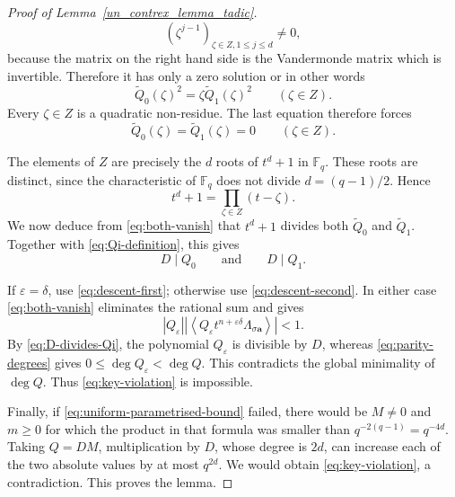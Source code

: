 \documentclass[10pt,a4paper]{amsart}
\begin{document}
\begin{proof}[Proof of Lemma~\ref{un_contrex_lemma_tadic}]
$$(\zeta^{j-1})_{\zeta\in Z, 1\le j\le d }\neq 0,
$$
because the matrix on the right hand side is the Vandermonde matrix
which is invertible. Therefore it has only a zero solution or in
other words
$$
 \widetilde Q_0(\zeta)^2
 =\zeta\widetilde Q_1(\zeta)^2
 \qquad(\zeta\in Z).
$$
Every $\zeta\in Z$ is a quadratic non-residue. The last equation
therefore forces
\begin{equation} \label{eq:both-vanish}
 \widetilde Q_0(\zeta)=\widetilde Q_1(\zeta)=0
 \qquad(\zeta\in Z).
\end{equation}

The elements of $Z$ are precisely the $d$ roots of $t^d+1$ in
$\mathbb F_q$.  These roots are distinct, since the characteristic of
$\mathbb F_q$ does not divide $d=(q-1)/2$.  Hence
\[
 t^d+1=\prod_{\zeta\in Z}(t-\zeta).
\]
We now deduce from \eqref{eq:both-vanish} that $t^d+1$ divides both
$\widetilde Q_0$ and $\widetilde Q_1$.  Together with
\eqref{eq:Qi-definition}, this gives
\begin{equation} \label{eq:D-divides-Qi}
 D\mid Q_0
 \qquad\text{and}\qquad
 D\mid Q_1.
\end{equation}

If $\varepsilon=\delta$, use \eqref{eq:descent-first}; otherwise use
\eqref{eq:descent-second}.  In either case \eqref{eq:both-vanish}
eliminates the rational sum and gives
\begin{equation} \label{eq:smaller-violation}
 \left|Q_\varepsilon\right|
 \left|\left\langle
 Q_\varepsilon t^{n+\varepsilon\delta}
 \Lambda_{\sigma\mathbf a}\right\rangle\right|<1.
\end{equation}
By \eqref{eq:D-divides-Qi}, the polynomial $Q_\varepsilon$ is
divisible by $D$, whereas \eqref{eq:parity-degrees} gives $0\leq\deg
Q_\varepsilon<\deg Q$.  This contradicts the global minimality of
$\deg Q$.  Thus \eqref{eq:key-violation} is impossible.

Finally, if \eqref{eq:uniform-parametrised-bound} failed, there
would be $M\ne0$ and $m\geq0$ for which the product in that formula
was smaller than $q^{-2(q-1)}=q^{-4d}$.  Taking $Q=DM$,
multiplication by $D$, whose degree is $2d$, can increase each of
the two absolute values by at most $q^{2d}$. We would obtain
\eqref{eq:key-violation}, a contradiction.  This proves the lemma.
\end{proof}
\end{document}

